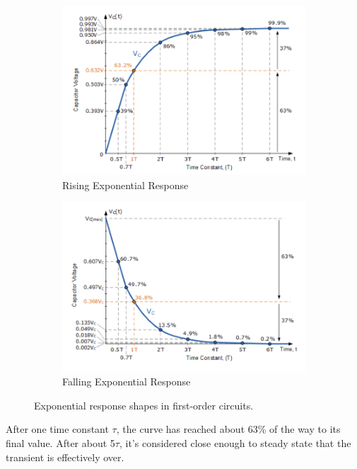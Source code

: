 \documentclass[12pt]{article}
\begin{document}
\begin{figure}[H]
	\centering
	\begin{subfigure}[b]{0.45\linewidth}
		\centering
		\includegraphics[width=\linewidth]{rising_exp}
		\caption{Rising Exponential Response}
		\label{fig:rising_exp}
	\end{subfigure}
	\hfill
	\begin{subfigure}[b]{0.45\linewidth}
		\centering
		\includegraphics[width=\linewidth]{falling_exp.png}
		\caption{Falling Exponential Response}
		\label{fig:falling_exp}
	\end{subfigure}
	\caption{Exponential response shapes in first-order circuits.}
	\label{fig:exp_shapes}
\end{figure}

After one time constant $\tau$, the curve has reached about 63\% of the way to
its final value. After about 5$\tau$, it’s considered close enough to steady
state that the transient is effectively over.
\end{document}
